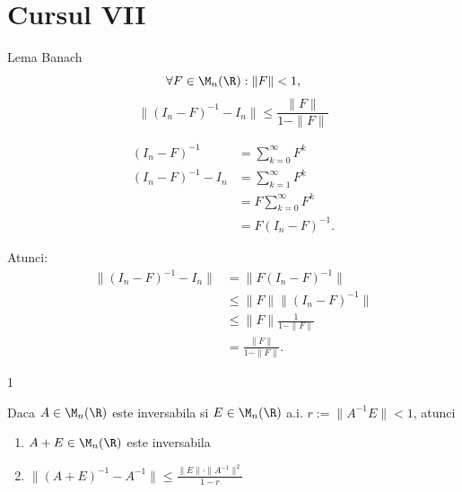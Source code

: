
\section*{Cursul VII}

\begin{corolar}{Lema Banach}
    $$ \forall F \in \M_n(\R) : \|F\| < 1, $$
    $$ \|(I_n - F)^{-1} - I_n\| \leq \frac{\|F\|}{1 - \|F\|} $$
\end{corolar}

\begin{demonstratie}
    \begin{align*}
        (I_n - F)^{-1} &= \sum_{k=0}^{\infty} F^k  \\
        (I_n - F)^{-1} - I_n &= \sum_{k=1}^{\infty} F^k\\
        &= F \sum_{k=0}^{\infty} F^k \\
        &= F (I_n - F)^{-1}.
    \end{align*}

    Atunci:
    \begin{align*}
        \|(I_n - F)^{-1} - I_n\| &= \| F (I_n - F)^{-1} \| \\
        &\leq \| F \| \| (I_n - F)^{-1} \| \\
        &\leq \| F \| \frac{1}{1 - \|F\|} \\
        &= \frac{\|F\|}{1 - \|F\|}.
    \end{align*}
\end{demonstratie}

\begin{teorema}{1}

Daca $A \in \M_n(\R)$ este inversabila si $E \in \M_n(\R)$ a.i. $r := \|A^{-1}E\| < 1$, atunci
\begin{enumerate}
    \item[(i)] $A+E \in \M_n(\R)$ este inversabila
    \item[(ii)] $ \| (A+E)^{-1} - A^{-1} \| \leq \frac{\|E\| \cdot \|A^{-1}\|^2}{1-r} $
\end{enumerate}
\end{teorema}

